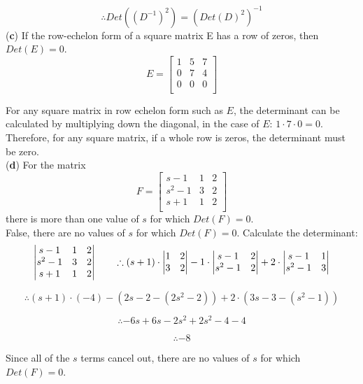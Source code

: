 \documentclass[12pt]{article}
\begin{document}
$$
\therefore
Det((D^{-1})^2)=(Det(D)^2)^{-1}
$$
\medskip
(\textbf{c}) If the row-echelon form of a square matrix E has a row of zeros, then $Det(E)=0$.\\
$$
E = 
\begin{bmatrix}
   1 & 5 & 7 \\
   0 & 7 & 4  \\
   0 & 0 & 0 \\
\end{bmatrix}
$$

For any square matrix in row echelon form such as $E$, the determinant can be calculated by multiplying down the diagonal, in the case of $E$: $1\cdot7\cdot0=0$. Therefore, for any square matrix, if a whole row is zeros, the determinant must be zero. \\
\medskip
(\textbf{d}) For the matrix
$$
F = 
\begin{bmatrix}
   s-1 & 1 & 2 \\
   s^2-1 & 3 & 2  \\
   s+1 & 1 & 2 \\
\end{bmatrix}
$$
there is more than one value of $s$ for which $Det(F)=0$.\\
False, there are no values of $s$ for which $Det(F)=0$. Calculate the determinant:
$$
\begin{vmatrix}
   s-1 & 1 & 2\\
   s^2-1 & 3 & 2\\
   s+1 & 1 & 2\\
\end{vmatrix}
\hspace*{20px}
\therefore
(s+1)\cdot
\begin{vmatrix}
1 & 2 \\
3 & 2
\end{vmatrix}
-1\cdot
\begin{vmatrix}
s-1 & 2 \\
s^2-1 & 2
\end{vmatrix}
+2\cdot
\begin{vmatrix}
s-1 & 1 \\
s^2-1 & 3
\end{vmatrix}
$$

$$
\therefore
(s+1)\cdot(-4)-(2s-2-(2s^2-2))+2\cdot(3s-3-(s^2-1))
$$

$$
\therefore
-6s+6s-2s^2+2s^2-4-4
$$

$$
\therefore
-8
$$

Since all of the $s$ terms cancel out, there are no values of $s$ for which $Det(F)=0$.
\end{document}
